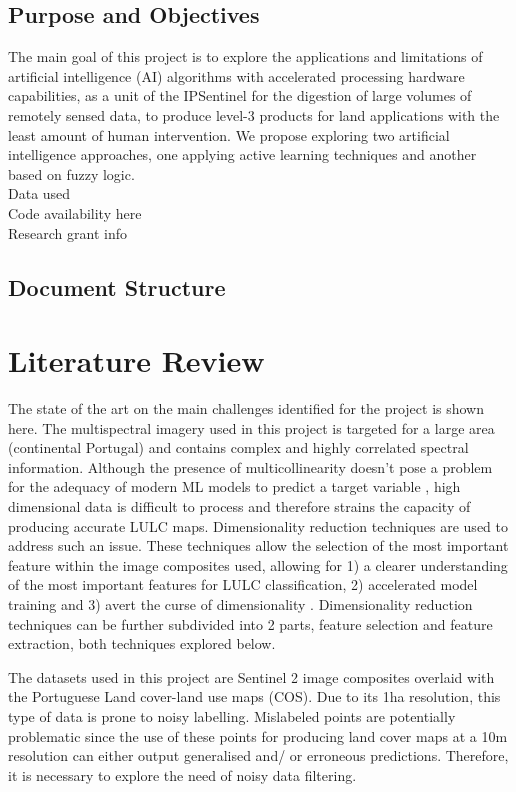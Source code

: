 \documentclass[12pt, english, openany]{book}
\begin{document}
\section{Purpose and Objectives}

The main goal of this project is to explore the applications and limitations of
artificial intelligence (AI) algorithms with accelerated processing hardware
capabilities, as a unit of the IPSentinel for the digestion of large volumes of
remotely sensed data, to produce level-3 products for land applications with
the least amount of human intervention. We propose exploring two artificial
intelligence approaches, one applying active learning techniques and another
based on fuzzy logic.
\\
Data used
\\
Code availability here
\\
Research grant info

\section{Document Structure}


\chapter{Literature Review}

The state of the art on the main challenges identified for the project is shown
here. The multispectral imagery used in this project is targeted for a large
area (continental Portugal) and contains complex and highly correlated spectral
information. Although the presence of multicollinearity doesn't pose a problem
for the adequacy of modern ML models to predict a target variable
\cite{Farrell2019}, high dimensional data is difficult to process and therefore
strains the capacity of producing accurate LULC maps. Dimensionality reduction
techniques are used to address such an issue. These techniques allow the
selection of the most important feature within the image composites used,
allowing for 1) a clearer understanding of the most important features for LULC
classification, 2) accelerated model training and 3) avert the curse of
dimensionality \cite{Ghojogh2019}. Dimensionality reduction techniques can be
further subdivided into 2 parts, feature selection and feature extraction, both
techniques explored below.

The datasets used in this project are Sentinel 2 image composites overlaid with
the Portuguese Land cover-land use maps (COS). Due to its 1ha resolution, this
type of data is prone to noisy labelling. %
Mislabeled points are potentially problematic since the use of these points for
producing land cover maps at a 10m resolution can either output generalised and/
or erroneous predictions. Therefore, it is necessary to explore the need of
noisy data filtering.
\end{document}
